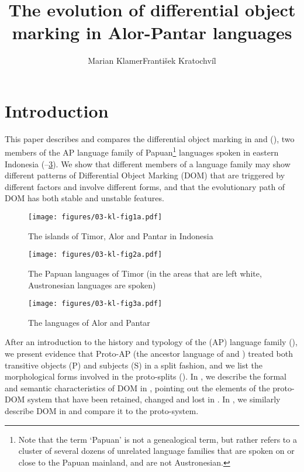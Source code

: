\documentclass[output=paper]{LSP/langsci}
\author{Marian Klamer\affiliation{Leiden University}\lastand František Kratochvíl\affiliation{Palacký University, Olomouc}
}
\title{The evolution of differential object marking in Alor-Pantar languages}
\begin{document}
\section{Introduction}
\largerpage
\label{03-kl-sec:1}
This paper describes and compares the differential object marking in  \citep{Klamer2010Grammar} and  (\citealt{Kratochvil2007Grammar,Kratochvil2014Differential,Kratochviletal2015Degrees}), two members of the AP language family of Papuan\footnote{Note that the term ‘Papuan’ is not a genealogical term, but rather refers to a cluster of several dozens of unrelated language families that are spoken on or close to the Papuan mainland, and are not Austronesian.} languages spoken in eastern Indonesia (--\ref{03-kl-fig:3}). We show that different members of a language family may show different patterns of Differential Object Marking (DOM) that are triggered by different factors and involve different forms, and that the evolutionary path of DOM has both stable and unstable features.

\begin{figure}
\texttt{[image: figures/03-kl-fig1a.pdf]}
\caption{The islands of Timor, Alor and Pantar in Indonesia}
\label{03-kl-fig:1}
\end{figure}

\begin{figure}
\texttt{[image: figures/03-kl-fig2a.pdf]}
\caption{The Papuan languages of Timor (in the areas that are left white, Austronesian languages are spoken)}
\label{03-kl-fig:2}
\end{figure}

\begin{figure}
\texttt{[image: figures/03-kl-fig3a.pdf]}
\caption{The languages of Alor and Pantar}
\label{03-kl-fig:3}
\end{figure} %

After an introduction to the history and typology of the  (AP) language family (), we present evidence that Proto-AP (the ancestor language of  and ) treated both transitive objects (P) and  subjects (S) in a split fashion, and we list the morphological forms involved in the proto-splits (). In , we describe the formal and semantic characteristics of DOM in , pointing out the elements of the proto-DOM system that have been retained, changed and lost in . In , we similarly describe DOM in  and compare it to the proto-system.
\end{document}
